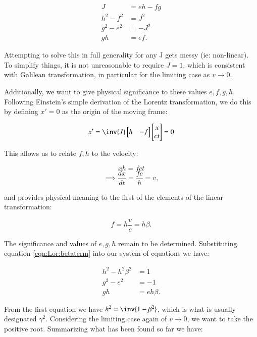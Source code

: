 \begin{align}
J &= eh - fg \\
h^2 - f^2 &= J^2 \\
g^2 - e^2 &= -J^2 \\
g h &= e f.
\end{align}

Attempting to solve this in full generality for any J gets messy (ie: non-linear).
To simplify things, it is not unreasonable to
require $J = 1$, which is consistent with Galilean transformation, in particular for the limiting case as $v \rightarrow 0$.

Additionally, we want to give physical significance to these values $e,f,g,h$.  Following Einstein's simple derivation
of the Lorentz transformation, we do this by defining $x'=0$ as the origin of the moving frame:

\[
x'
=
\inv{J}
\begin{bmatrix}
h & -f \\
\end{bmatrix}
\begin{bmatrix}
x \\
c t \\
\end{bmatrix}
= 0
\]

This allows us to relate $f,h$ to the velocity:

\[
x h = f c t
\]
\[
\implies
\frac{dx}{dt} = \frac{f c}{h} = v,
\]

and provides physical meaning to the first of the elements of the linear transformation:

\begin{equation}\label{eqn:Lor:betaterm}
f = h \frac{v}{c} = h \beta.
\end{equation}

The significance and values of $e,g,h$ remain to be determined.  Substituting equation \ref{eqn:Lor:betaterm} into our
system of equations we have:

\begin{align*}
h^2 - h^2 \beta^2 &= 1 \\
g^2 - e^2 &= -1 \\
g h &= e h \beta.
\end{align*}

From the first equation we have $h^2 = \inv{1 -\beta^2}$, which is what is usually designated $\gamma^2$.  Considering
the limiting case again of $v \rightarrow 0$, we want to take the positive root.  Summarizing what has been found 
so far we have:

